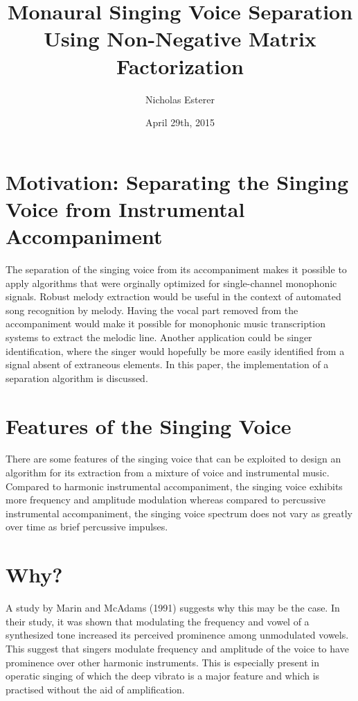 \documentclass[10pt]{article}
\begin{document}
\title{Monaural Singing Voice Separation Using Non-Negative Matrix 
Factorization}
\date{April 29th, 2015}
\author{Nicholas Esterer}
\maketitle

\section*{Motivation: Separating the Singing Voice from Instrumental
Accompaniment}
The separation of the singing voice from its accompaniment makes it possible to
apply algorithms that were orginally optimized for single-channel monophonic
signals. Robust melody extraction would be useful in the context of automated
song recognition by melody. Having the vocal part removed from the accompaniment
would make it possible for monophonic music transcription systems to extract the
melodic line. Another application could be singer identification, where the
singer would hopefully be more easily identified from a signal absent of
extraneous elements. In this paper, the implementation of a separation algorithm
is discussed.

\section*{Features of the Singing Voice}
There are some features of the singing voice that can be exploited to design an
algorithm for its extraction from a mixture of voice and instrumental music.
Compared to harmonic instrumental accompaniment, the singing voice exhibits more
frequency and amplitude modulation whereas compared to percussive instrumental
accompaniment, the singing voice spectrum does not vary as greatly over time as
brief percussive impulses.
\section*{Why?}
A study by Marin and McAdams (1991) suggests why this may be the case. In
their study, it was shown that modulating the frequency and vowel of a
synthesized tone increased its perceived prominence among unmodulated
vowels. This suggest that singers modulate frequency and amplitude of the
voice to have prominence over other harmonic instruments. This is especially
present in operatic singing of which the deep vibrato is a major feature and
which is practised without the aid of amplification.
\end{document}
